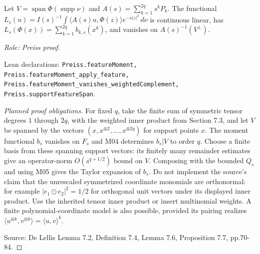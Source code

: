 \begin{lemma}
\label{lem:moment-feature-annihilation}







Let $V=\operatorname{span}\Phi(\operatorname{supp}\nu)$ and $A(s)=\sum_{k=1}^{2q}s^kP_k$. The functional $L_s(u)=I(s)^{-1}\int\langle A(s)u,\Phi(z)\rangle e^{-s|z|^2}\,d\nu$ is continuous linear, has $L_s(\Phi(x))=\sum_{k=1}^{2q}b_{k,s}(x^k)$, and vanishes on $A(s)^{-1}(V^\perp)$.
\par\emph{Role: Preiss proof.}
\par Lean declarations: \texttt{Preiss.featureMoment, Preiss.featureMoment\_apply\_feature, Preiss.featureMoment\_vanishes\_weightedComplement, Preiss.supportFeatureSpan}.
\end{lemma}
\begin{proof}[Planned proof obligations]
For fixed $q$, take the finite sum of symmetric tensor degrees $1$ through
$2q$, with the weighted inner product from Section 7.3, and let $V$ be spanned
by the vectors $(x,x^{\otimes2},\ldots,x^{\otimes2q})$ for support points $x$.
The moment functional $b_s$ vanishes on $F_s$ and M04 determines
$b_s|V$ to order $q$. Choose a finite basis from these spanning support vectors:
its finitely many remainder estimates give an operator-norm
$O(s^{q+1/2})$ bound on $V$. Composing with the bounded $Q_s$ and using M05
gives the Taylor expansion of $b_s$.
Do not implement the source's claim that the unrescaled symmetrized coordinate
monomials are orthonormal: for example
$|e_1\odot e_2|^2=1/2$ for orthogonal unit vectors under its displayed inner
product. Use the inherited tensor inner product or insert multinomial weights.
A finite polynomial-coordinate model is also possible, provided its pairing
realizes $\langle u^{\otimes k},v^{\otimes k}\rangle=\langle u,v\rangle^k$.
\par Source: De Lellis Lemma 7.2, Definition 7.4, Lemma 7.6, Proposition 7.7, pp.70-84.
\end{proof}

